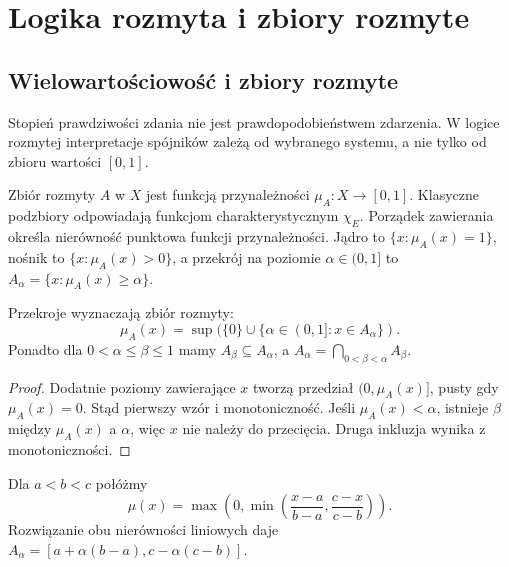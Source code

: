 \chapter{Logika rozmyta i zbiory rozmyte}\label{ch:lst-fuzzy-logic}

\section{Wielowartościowość i zbiory rozmyte}
Stopień prawdziwości zdania nie jest prawdopodobieństwem zdarzenia.
W logice rozmytej interpretacje spójników zależą od wybranego systemu,
a nie tylko od zbioru wartości $[0,1]$.
\begin{definicja}\label{def:lst-fuzzy-set}
Zbiór rozmyty $A$ w $X$ jest funkcją przynależności $\mu_A:X\to[0,1]$.
Klasyczne podzbiory odpowiadają funkcjom charakterystycznym $\chi_E$.
Porządek zawierania określa nierówność punktowa funkcji przynależności.
Jądro to $\{x:\mu_A(x)=1\}$, nośnik to $\{x:\mu_A(x)>0\}$, a
przekrój na poziomie $\alpha\in(0,1]$ to $A_\alpha=\{x:\mu_A(x)\geq\alpha\}$.
\end{definicja}
\begin{twierdzenie}\label{thm:lst-fuzzy-cuts}
Przekroje wyznaczają zbiór rozmyty:
\[
\mu_A(x)=\sup(\{0\}\cup\{\alpha\in(0,1]:x\in A_\alpha\}).
\]
Ponadto dla $0<\alpha\leq\beta\leq1$ mamy $A_\beta\subseteq A_\alpha$,
a $A_\alpha=\bigcap_{0<\beta<\alpha}A_\beta$.
\end{twierdzenie}
\begin{proof}
Dodatnie poziomy zawierające $x$ tworzą przedział $(0,\mu_A(x)]$,
pusty gdy $\mu_A(x)=0$. Stąd pierwszy wzór i monotoniczność.
Jeśli $\mu_A(x)<\alpha$, istnieje $\beta$ między $\mu_A(x)$ a $\alpha$,
więc $x$ nie należy do przecięcia. Druga inkluzja wynika z monotoniczności.
\end{proof}
\begin{przyklad}
Dla $a<b<c$ połóżmy
\[
\mu(x)=\max\left(0,\min\left(\frac{x-a}{b-a},\frac{c-x}{c-b}\right)\right).
\]
Rozwiązanie obu nierówności liniowych daje
$A_\alpha=[a+\alpha(b-a),c-\alpha(c-b)]$.
\begin{center}
\end{center}
\end{przyklad}
